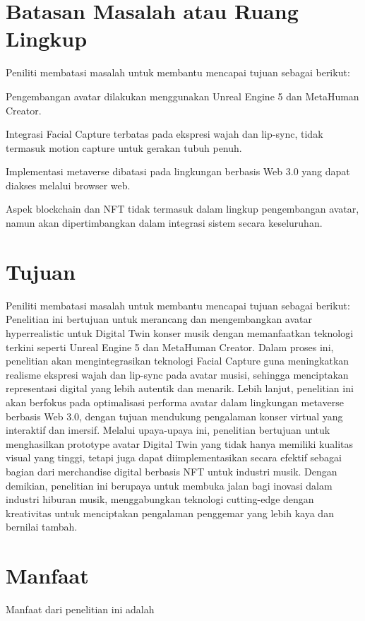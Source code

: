 \section{Batasan Masalah atau Ruang Lingkup}

Peniliti membatasi masalah untuk membantu mencapai tujuan sebagai berikut:
\\

\begin{enumarate}
\item Pengembangan avatar dilakukan menggunakan Unreal Engine 5 dan MetaHuman Creator.
\item Integrasi Facial Capture terbatas pada ekspresi wajah dan lip-sync, tidak termasuk motion capture untuk gerakan tubuh penuh.
\item Implementasi metaverse dibatasi pada lingkungan berbasis Web 3.0 yang dapat diakses melalui browser web.
\item Aspek blockchain dan NFT tidak termasuk dalam lingkup pengembangan avatar, namun akan dipertimbangkan dalam integrasi sistem secara keseluruhan.
\end{enumarate}

\section{Tujuan}

Peniliti membatasi masalah untuk membantu mencapai tujuan sebagai berikut:
\\

Penelitian ini bertujuan untuk merancang dan mengembangkan avatar hyperrealistic untuk Digital Twin konser musik dengan memanfaatkan
teknologi terkini seperti Unreal Engine 5 dan MetaHuman Creator. Dalam proses ini, penelitian akan mengintegrasikan teknologi Facial
Capture guna meningkatkan realisme ekspresi wajah dan lip-sync pada avatar musisi, sehingga menciptakan representasi digital yang 
lebih autentik dan menarik. Lebih lanjut, penelitian ini akan berfokus pada optimalisasi performa avatar dalam lingkungan metaverse 
berbasis Web 3.0, dengan tujuan mendukung pengalaman konser virtual yang interaktif dan imersif. Melalui upaya-upaya ini, penelitian 
bertujuan untuk menghasilkan prototype avatar Digital Twin yang tidak hanya memiliki kualitas visual yang tinggi, tetapi juga dapat 
diimplementasikan secara efektif sebagai bagian dari merchandise digital berbasis NFT untuk industri musik. Dengan demikian, 
penelitian ini berupaya untuk membuka jalan bagi inovasi dalam industri hiburan musik, menggabungkan teknologi cutting-edge dengan 
kreativitas untuk menciptakan pengalaman penggemar yang lebih kaya dan bernilai tambah.

\section{Manfaat}

Manfaat dari penelitian ini adalah \lipsum[8][1-14]
